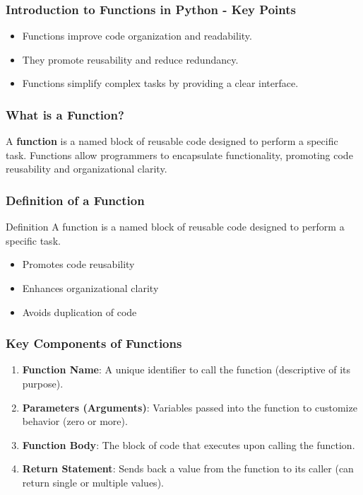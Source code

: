\documentclass{beamer}
\begin{document}
\begin{frame}[fragile]
    \frametitle{Introduction to Functions in Python - Key Points}
    \begin{itemize}
        \item Functions improve code organization and readability.
        \item They promote reusability and reduce redundancy.
        \item Functions simplify complex tasks by providing a clear interface.
    \end{itemize}
\end{frame}

\begin{frame}[fragile]
    \frametitle{What is a Function?}
    A \textbf{function} is a named block of reusable code designed to perform a specific task.
    Functions allow programmers to encapsulate functionality, promoting code reusability and organizational clarity.
\end{frame}

\begin{frame}[fragile]
    \frametitle{Definition of a Function}
    \begin{block}{Definition}
    A function is a named block of reusable code designed to perform a specific task.
    \end{block}
    
    \begin{itemize}
        \item Promotes code reusability
        \item Enhances organizational clarity
        \item Avoids duplication of code
    \end{itemize}
\end{frame}

\begin{frame}[fragile]
    \frametitle{Key Components of Functions}
    \begin{enumerate}
        \item \textbf{Function Name}: A unique identifier to call the function (descriptive of its purpose).
        \item \textbf{Parameters (Arguments)}: Variables passed into the function to customize behavior (zero or more).
        \item \textbf{Function Body}: The block of code that executes upon calling the function.
        \item \textbf{Return Statement}: Sends back a value from the function to its caller (can return single or multiple values).
    \end{enumerate}
\end{frame}
\end{document}
